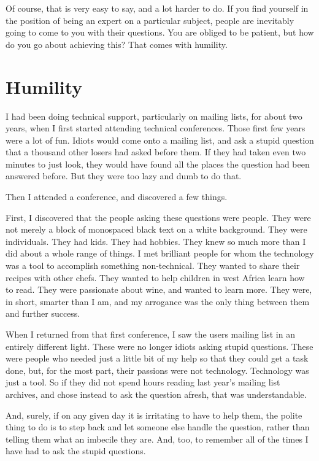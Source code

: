 Of course, that is very easy to say, and a lot harder to do. If you find yourself in the position of being an expert on a particular subject, people are inevitably going to come to you with their questions.
You are obliged to be patient, but how do you go about achieving this? That comes with humility.

\section*{Humility}
I had been doing technical support, particularly on mailing lists, for about two years, when I first started attending technical conferences. Those first few years were a lot of fun. Idiots would come onto a mailing list, and ask a stupid question that a thousand other losers had asked before them. If they had taken even two minutes to just look, they would have found all the places the question had been answered before. But they were too lazy and dumb to do that.

Then I attended a conference, and discovered a few things.

First, I discovered that the people asking these questions were people. They were not merely a block of monospaced black text on a white background. They were individuals. They had kids. They had hobbies. They knew so much more than I did about a whole range of things. I met brilliant people for whom the technology was a tool to accomplish something non-technical. They wanted to share their recipes with other chefs. They wanted to help children in west Africa learn how to read. They were passionate about wine, and wanted to learn more. They were, in short, smarter than I am, and my arrogance was the only thing between them and further success.

When I returned from that first conference, I saw the users mailing list in an entirely different light. These were no longer idiots asking stupid questions. These were people who needed just a little bit of my help so that they could get a task done, but, for the most part, their passions were not technology. Technology was just a tool. So if they did not spend hours reading last year’s mailing list archives, and chose instead to ask the question afresh, that was understandable.

And, surely, if on any given day it is irritating to have to help them, the polite thing to do is to step back and let someone else handle the question, rather than telling them what an imbecile they are. And, too, to remember all of the times I have had to ask the stupid questions.

